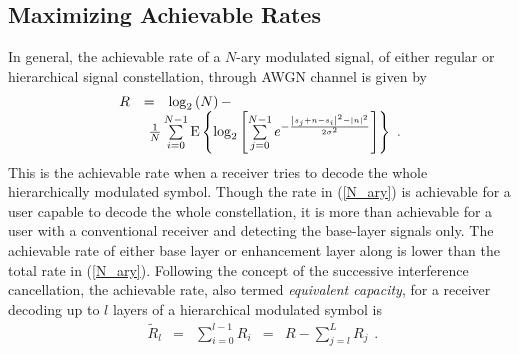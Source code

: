 \documentclass[conference]{IEEEtran}
\begin{document}
\subsection{Maximizing Achievable Rates~\label{Info_Theory}}
In general, the achievable rate of a $N$-ary modulated signal, of
either regular or hierarchical signal constellation, through AWGN
channel is given by~\cite{Unge82}
\begin{equation}
\begin{array}{lcl}
R&=&\log_{2}\left(N\right)-\\
&&\hspace{-0.20in}\frac{1}{N}\sum\limits_{i=0}^{N-1}\mbox{E}\left\{\log_{2}\left[\sum\limits_{j=0}^{N-1}e^{-\frac{\left|s_{j}+n-s_{i}\right|^2-\left|n\right|^2}{2\sigma^2}}\right]\right\}\
.
\end{array}\label{N_ary}
\end{equation}
\noindent This is the achievable rate when a receiver tries to
decode the whole hierarchically modulated symbol. Though the rate
in (\ref{N_ary}) is achievable for a user capable to decode the
whole constellation, it is more than achievable for a user with a
conventional receiver and detecting the base-layer signals only.
The achievable rate of either base layer or enhancement layer
along is lower than the total rate in (\ref{N_ary}). Following the
concept of the successive interference cancellation, the
achievable rate, also termed {\em equivalent capacity}, for a
receiver decoding up to $l$ layers of a hierarchical modulated
symbol is~\cite{Huber94}
\begin{equation}
\begin{array}{rcccl}
\tilde{R}_{l}&=&\sum\limits_{i=0}^{l-1}R_{i}& = &
R-\sum\limits_{j=l}^{L}{R}_{j}
\end{array}.\label{R_equiv}
\end{equation}
\end{document}
